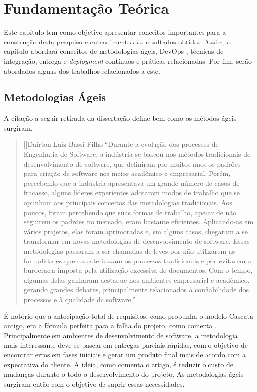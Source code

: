 \chapter{Fundamentação Teórica}

Este capítulo tem como objetivo apresentar conceitos importantes para a
construção desta pesquisa e entendimento dos resultados obtidos. Assim, o capítulo abordará conceitos de metodologias ágeis, DevOps \cite{devopsWiki}, técnicas de integração, entrega e \emph{deployment} contínuos \cite{fowlerCI, fowlerCD} e práticas relacionadas. Por fim, serão abordados alguns dos trabalhos relacionados a este.


\section{Metodologias Ágeis}

A citação a seguir retirada da dissertação \cite{experienciaComAgil} define bem como os métodos ágeis surgiram.

    
\begin{quotation}[]{Dairton Luiz Bassi Filho}
    ``Durante a evolução dos processos de Engenharia de Software, a
indústria se baseou nos métodos tradicionais de desenvolvimento de
software, que definiram por muitos anos os padrões para criação de
software nos meios acadêmico e empresarial. Porém, percebendo que a
indústria apresentava um grande número de casos de fracasso, alguns
líderes experientes adotaram modos de trabalho que se opunham aos
principais conceitos das metodologias tradicionais. Aos poucos, foram
percebendo que suas formas de trabalho, apesar de não seguirem os
padrões no mercado, eram bastante eficientes. Aplicando-as em vários 
projetos, elas foram aprimoradas e, em alguns casos, chegaram a se
transformar em novas metodologias de desenvolvimento de software.
Essas metodologias passaram a ser chamadas de leves por não
utilizarem as formalidades que caracterizavam os processos tradicionais
e por evitarem a burocracia imposta pela utilização excessiva de
documentos. Com o tempo, algumas delas ganharam destaque nos
ambientes empresarial e acadêmico, gerando grandes debates,
principalmente relacionados à confiabilidade dos processos e à
qualidade do software.''
\end{quotation}

É notório que a antecipação total de requisitos, como propunha o modelo Cascata antigo, era a fórmula perfeita para a falha do projeto, como comenta \cite{agileSoftwareDevelopment}. Principalmente em ambientes de desenvolvimento de software, a metodologia mais interessante deve se basear em entregas parciais rápidas, com o objetivo de encontrar erros em fases iniciais e gerar um produto final mais de acordo com a expectativa do cliente. A ideia, como comenta o artigo, é reduzir o custo de mudanças durante o todo o desenvolvimento do projeto. As metodologias ágeis surgiram então com o objetivo de suprir essas necessidades.

